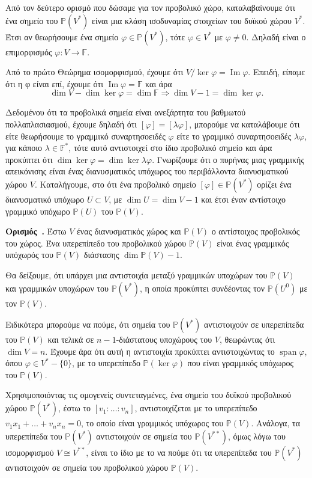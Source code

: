 \documentclass[12pt, a4paper]{book}
\newcounter{definition}[section]
\newenvironment{definition}[1][]{\refstepcounter{definition}\par\medskip
   \textbf{Ορισμός~\thedefinition. #1} \rmfamily}{\medskip}
\DeclareMathOperator{\Span}{span}
\DeclareMathOperator{\Ima}{Im}
\begin{document}
Από τον δεύτερο ορισμό που δώσαμε για τον προβολικό χώρο, καταλαβαίνουμε ότι ένα σημείο του $\mathbb{P}(V^*)$ είναι μια κλάση ισοδυναμίας στοιχείων του δυϊκού χώρου $V^*$. Έτσι αν θεωρήσουμε ένα σημείο $φ \in \mathbb{P}(V^*)$, τότε $φ \in V^*$ με $φ \neq 0$. Δηλαδή είναι ο επιμορφισμός $φ: V \rightarrow \mathbb{F}$. 

Από το πρώτο Θεώρημα ισομορφισμού, έχουμε ότι $V \big/ \ker{φ} = \Ima{φ}$. Επειδή, είπαμε ότι η φ είναι επί, έχουμε ότι $\Ima{φ} = \mathbb{F}$ και άρα
\begin{displaymath}
\dim{V} - \dim{\ker{φ}} = \dim{\mathbb{F}} \Rightarrow \dim{V} - 1 = \dim{\ker{φ}}.
\end{displaymath}

Δεδομένου ότι τα προβολικά σημεία είναι ανεξάρτητα του βαθμωτού πολλαπλασιασμού, έχουμε δηλαδή ότι $[φ] = [λφ]$, μπορούμε να καταλάβουμε ότι είτε θεωρήσουμε το γραμμικό συναρτησοειδές $φ$ είτε το γραμμικό συναρτησοειδές $λφ$, για κάποιο $λ \in \mathbb{F}^*$, τότε αυτό αντιστοιχεί στο ίδιο προβολικό σημείο και άρα προκύπτει ότι $\dim{\ker{φ}} = \dim{\ker{λφ}}$. Γνωρίζουμε ότι ο πυρήνας μιας γραμμικής απεικόνισης είναι ένας διανυσματικός υπόχωρος του περιβάλλοντα διανυσματικού χώρου $V$. Καταλήγουμε, στο ότι ένα προβολικό σημείο $[φ] \in \mathbb{P}(V^*)$ ορίζει ένα διανυσματικό υπόχωρο $U \subset V$, με $\dim{U} = \dim{V} - 1$ και έτσι έναν αντίστοιχο γραμμικό υπόχωρο $\mathbb{P}(U)$ του $\mathbb{P}(V)$.

\begin{definition}
Έστω $V$ ένας διανυσματικός χώρος και $\mathbb{P}(V)$ ο αντίστοιχος προβολικός του χώρος. Ένα υπερεπίπεδο του προβολικού χώρου $\mathbb{P}(V)$ είναι ένας γραμμικός υπόχωρός του $\mathbb{P}(V)$ διάστασης $\dim{\mathbb{P}(V)}-1$.
\end{definition}

Θα δείξουμε, ότι υπάρχει μια αντιστοιχία μεταξύ γραμμικών υποχώρων του $\mathbb{P}(V)$ και γραμμικών υποχώρων του $\mathbb{P}(V^*)$, η οποία προκύπτει συνδέοντας τον $\mathbb{P}(U^0)$ με τον $\mathbb{P}(V)$.

Ειδικότερα μπορούμε να πούμε, ότι σημεία του $\mathbb{P}(V^*)$ αντιστοιχούν σε υπερεπίπεδα του $\mathbb{P}(V)$ και τελικά σε $n-1$-διάστατους υποχώρους του $V$, θεωρώντας ότι $\dim{V} = n$. Έχουμε άρα ότι αυτή η αντιστοιχία προκύπτει αντιστοιχώντας το $\Span{φ}$, όπου $φ \in V^* - \{0\}$, με το υπερεπίπεδο $\mathbb{P}(\ker{φ})$ που είναι γραμμικός υπόχωρος του $\mathbb{P}(V)$. 

Χρησιμοποιόντας τις ομογενείς συντεταγμένες, ένα σημείο του δυϊκού προβολικού χώρου $\mathbb{P}(V^*)$,  έστω το $[v_1:…:v_n]$, αντιστοιχίζεται με το υπερεπίπεδο $v_1x_1+…+v_nx_n =0$, το οποίο είναι γραμμικός υπόχωρος του $\mathbb{P}(V)$. Ανάλογα, τα υπερεπίπεδα του $\mathbb{P}(V^*)$ αντιστοιχούν σε σημεία του $\mathbb{P}(V^{**})$, όμως λόγω του ισομορφισμού $V \cong V^{**}$, είναι το ίδιο με το να πούμε ότι τα υπερεπίπεδα του $\mathbb{P}(V^*)$ αντιστοιχούν σε σημεία του προβολικού χώρου $\mathbb{P}(V)$.
\end{document}
